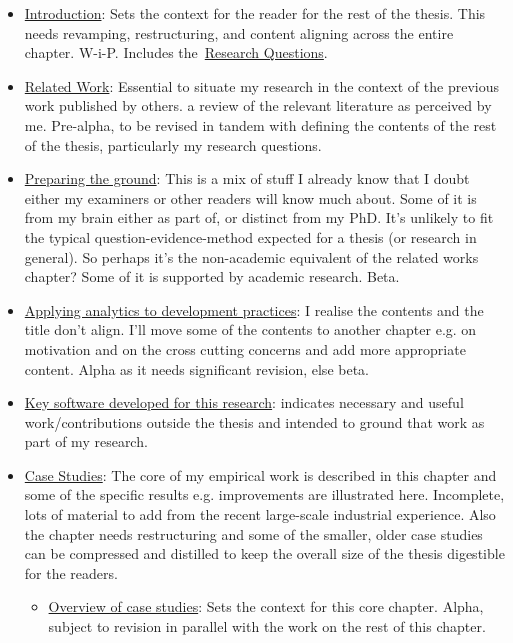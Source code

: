 \begin{itemize}
    \item \href{chapter-introduction}{Introduction}: Sets the context for the reader for the rest of the thesis. This needs revamping, restructuring, and content aligning across the entire chapter. W-i-P. Includes the~\href{section-research-questions}{Research Questions}.
    \item \href{chapter-related-work}{Related Work}: Essential to situate my research in the context of the previous work published by others. a review of the relevant literature as perceived by me. Pre-alpha, to be revised in tandem with defining the contents of the rest of the thesis, particularly my research questions.
    \item \href{chapter-preparing-the-ground}{Preparing the ground}: This is a mix of stuff I already know that I doubt either my examiners or other readers will know much about. Some of it is from my brain either as part of, or distinct from my PhD. It's unlikely to fit the typical question-evidence-method expected for a thesis (or research in general). So perhaps it's the non-academic equivalent of the related works chapter? Some of it is supported by academic research. Beta.
    \item \href{chapter-applying-analytics-to-development-practices}{Applying analytics to development practices}: I realise the contents and the title don't align. I'll move some of the contents to another chapter e.g. on motivation and on the cross cutting concerns and add more appropriate content. Alpha as it needs significant revision, else beta.
    \item \href{chapter-code-needed}{Key software developed for this research}: indicates necessary and useful work/contributions outside the thesis and intended to ground that work as part of my research.
    \item \href{chapter-case-studies}{Case Studies}: The core of my empirical work is described in this chapter and some of the specific results e.g. improvements are illustrated here. Incomplete, lots of material to add from the recent large-scale industrial experience. Also the chapter needs restructuring and some of the smaller, older case studies can be compressed and distilled to keep the overall size of the thesis digestible for the readers.
    \begin{itemize}
        \item \href{section-overview-of-case-studies}{Overview of case studies}: Sets the context for this core chapter. Alpha, subject to revision in parallel with the work on the rest of this chapter.

\end{itemize}
\end{itemize}
